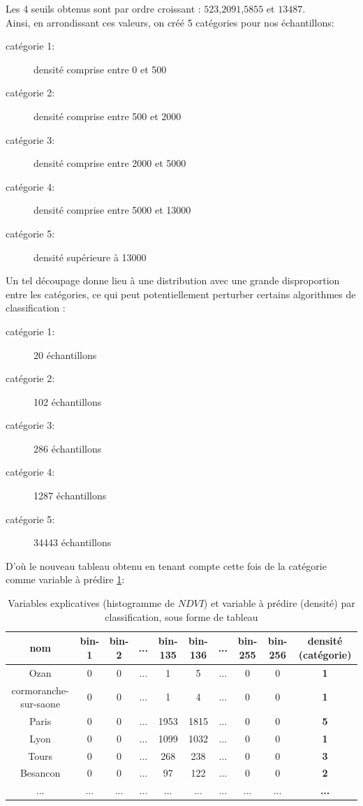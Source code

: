 \documentclass{book}
\begin{document}
Les 4 seuils obtenus sont par ordre croissant : $523$,$2091$,$5855$ et $13487$.\\
Ainsi, en arrondissant ces valeurs, on créé 5 catégories pour nos échantillons:\\
\begin{description}
 \item[catégorie 1:] densité comprise entre 0 et 500
 \item[catégorie 2:] densité comprise entre 500 et 2000
 \item[catégorie 3:] densité comprise entre 2000 et 5000
 \item[catégorie 4:] densité comprise entre 5000 et 13000
 \item[catégorie 5:] densité supérieure à 13000 
\end{description}
\clearpage

Un tel découpage donne lieu à une distribution avec une grande disproportion entre les catégories, ce qui peut potentiellement perturber certains algorithmes de classification :\\
\begin{description}
 \item[catégorie 1:] 20 échantillons
 \item[catégorie 2:] 102 échantillons
 \item[catégorie 3:] 286 échantillons
 \item[catégorie 4:] 1287 échantillons
 \item[catégorie 5:] 34443 échantillons
\end{description}

D'où le nouveau tableau obtenu en tenant compte cette fois de la catégorie comme variable à prédire \ref{data_class}:\\
\begin{table}[H]
\begin{center}
\begin{adjustbox}{max width=\textwidth}
\begin{tabular}{|c|c|c|c|c|c|c|c|c|>{\bfseries}c|}
\hline 
nom &  bin-1 & bin-2 & ... & bin-135 & bin-136 &... & bin-255 & bin-256 & densité (catégorie) \\
\hline 
Ozan & 0 & 0 & ... & 1 & 5 & ... & 0 & 0 & 1\\
\hline 
cormoranche-sur-saone & 0 & 0 & ... & 1 & 4 & ... & 0 & 0 & 1\\
\hline 
Paris & 0 & 0 & ... & 1953 & 1815 & ... & 0 & 0 & 5\\
\hline
Lyon & 0 & 0 & ... & 1099 & 1032 & ... & 0 & 0 & 1\\
\hline
Tours & 0 & 0 & ... & 268 & 238 & ... & 0 & 0 & 3\\
\hline
Besancon & 0 & 0 & ... & 97 & 122 & ... & 0 & 0 & 2\\
\hline 
... & ... & ... & ... & ... & ... & ... & ... & ... & ... \\
\hline
\end{tabular}
\end{adjustbox}
\end{center}
\caption{Variables explicatives (histogramme de $NDVI$) et variable à prédire (densité) par classification, sous forme de tableau}
\label{data_class}
\end{table}
\end{document}
